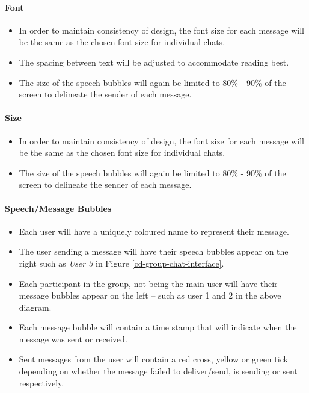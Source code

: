 \documentclass[11pt]{article}
\begin{document}
\paragraph{Font}
\begin{itemize}
\item	In order to maintain consistency of design, the font size for each message will be the same as the chosen font size for individual chats.
\item The spacing between text will be adjusted to accommodate reading best.
\item	The size of the speech bubbles will again be limited to 80\% - 90\% of the screen to delineate the sender of each message. \\
\end{itemize}

\paragraph{Size}
\begin{itemize}
\item	In order to maintain consistency of design, the font size for each message will be the same as the chosen font size for individual chats.
\item	The size of the speech bubbles will again be limited to 80\% - 90\% of the screen to delineate the sender of each message. \\
\end{itemize}

\paragraph{Speech/Message Bubbles}
\begin{itemize}
\item	Each user will have a uniquely coloured name to represent their message.
\item	The user sending a message will have their speech bubbles appear on the right such as \textit{User 3} in Figure \ref{cd-group-chat-interface}.
\item	Each participant in the group, not being the main user will have their message bubbles appear on the left – such as user 1 and 2 in the above diagram.
\item Each message bubble will contain a time stamp that will indicate when the message was sent or received.
\item Sent messages from the user will contain a red cross, yellow or green tick depending on whether the message failed to deliver/send, is sending or sent respectively.\\
\end{itemize}
\end{document}
